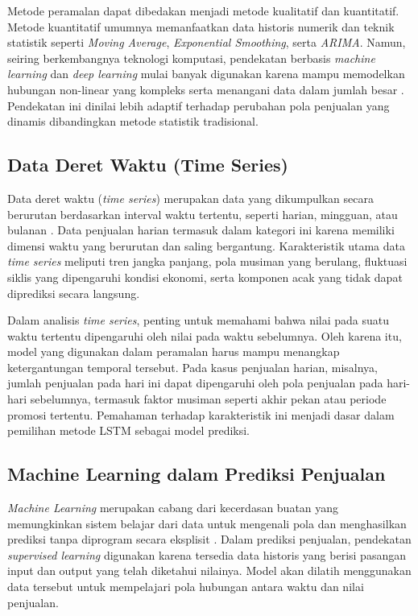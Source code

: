 Metode peramalan dapat dibedakan menjadi metode kualitatif dan kuantitatif. Metode kuantitatif umumnya memanfaatkan data historis numerik dan teknik statistik seperti \textit{Moving Average}, \textit{Exponential Smoothing}, serta \textit{ARIMA}. Namun, seiring berkembangnya teknologi komputasi, pendekatan berbasis \textit{machine learning} dan \textit{deep learning} mulai banyak digunakan karena mampu memodelkan hubungan non-linear yang kompleks serta menangani data dalam jumlah besar \cite{Ramadhan2022}. Pendekatan ini dinilai lebih adaptif terhadap perubahan pola penjualan yang dinamis dibandingkan metode statistik tradisional.

\subsection{Data Deret Waktu (Time Series)}
Data deret waktu (\textit{time series}) merupakan data yang dikumpulkan secara berurutan berdasarkan interval waktu tertentu, seperti harian, mingguan, atau bulanan \cite{Prasetyo2023}. Data penjualan harian termasuk dalam kategori ini karena memiliki dimensi waktu yang berurutan dan saling bergantung. Karakteristik utama data \textit{time series} meliputi tren jangka panjang, pola musiman yang berulang, fluktuasi siklis yang dipengaruhi kondisi ekonomi, serta komponen acak yang tidak dapat diprediksi secara langsung.

Dalam analisis \textit{time series}, penting untuk memahami bahwa nilai pada suatu waktu tertentu dipengaruhi oleh nilai pada waktu sebelumnya. Oleh karena itu, model yang digunakan dalam peramalan harus mampu menangkap ketergantungan temporal tersebut. Pada kasus penjualan harian, misalnya, jumlah penjualan pada hari ini dapat dipengaruhi oleh pola penjualan pada hari-hari sebelumnya, termasuk faktor musiman seperti akhir pekan atau periode promosi tertentu. Pemahaman terhadap karakteristik ini menjadi dasar dalam pemilihan metode LSTM sebagai model prediksi.

\subsection{Machine Learning dalam Prediksi Penjualan}
\textit{Machine Learning} merupakan cabang dari kecerdasan buatan yang memungkinkan sistem belajar dari data untuk mengenali pola dan menghasilkan prediksi tanpa diprogram secara eksplisit \cite{Goodfellow2016}. Dalam prediksi penjualan, pendekatan \textit{supervised learning} digunakan karena tersedia data historis yang berisi pasangan input dan output yang telah diketahui nilainya. Model akan dilatih menggunakan data tersebut untuk mempelajari pola hubungan antara waktu dan nilai penjualan.

